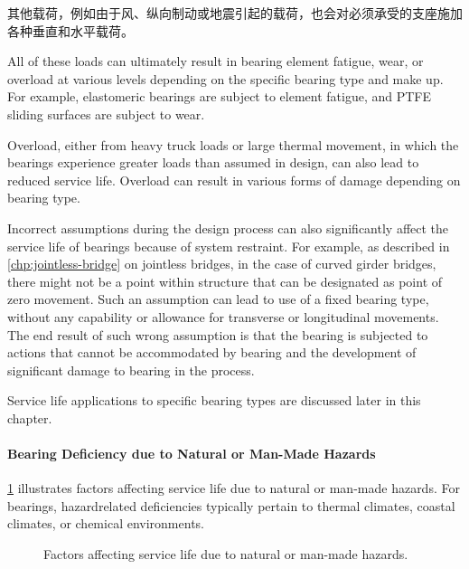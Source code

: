 其他载荷，例如由于风、纵向制动或地震引起的载荷，也会对必须承受的支座施加各种垂直和水平载荷。

All of these loads can ultimately result in bearing element fatigue, wear, or overload at various levels depending
on the specific bearing type and make up. For example, elastomeric bearings are subject to element fatigue, and
PTFE sliding surfaces are subject to wear.

Overload, either from heavy truck loads or large thermal movement, in which the bearings experience greater
loads than assumed in design, can also lead to reduced service life. Overload can result in various forms of damage
depending on bearing type.

Incorrect assumptions during the design process can also significantly affect the service life of bearings because
of system restraint. For example, as described in \ref{chp:jointless-bridge} on jointless bridges, in the case of curved girder bridges,
there might not be a point within structure that can be designated as point of zero movement. Such an assumption can
lead to use of a fixed bearing type, without any capability or allowance for transverse or longitudinal movements.
The end result of such wrong assumption is that the bearing is subjected to actions that cannot be accommodated by
bearing and the development of significant damage to bearing in the process.

Service life applications to specific bearing types are discussed later in this chapter.

\paragraph{Bearing Deficiency due to Natural or Man-Made Hazards}

\cref{fig:faulttree-bearing-hazards} illustrates factors affecting service life due to natural or man-made hazards. For bearings, hazardrelated
deficiencies typically pertain to thermal climates, coastal climates, or chemical environments.

\begin{figure}
  \caption{Factors affecting service life due to natural or man-made hazards.}
  \label{fig:faulttree-bearing-hazards}
\end{figure}

